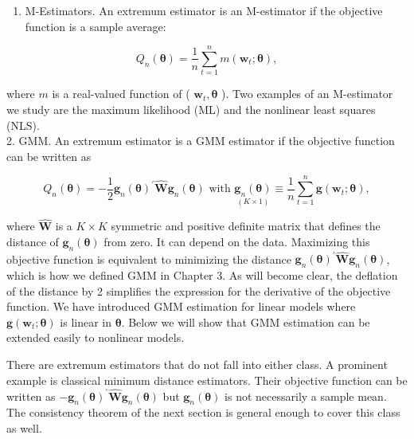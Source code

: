 \documentclass[10pt]{article}
\begin{document}
\begin{enumerate}
  \item M-Estimators. An extremum estimator is an M-estimator if the objective function is a sample average:
\end{enumerate}


\begin{equation*}
Q_{n}(\boldsymbol{\theta})=\frac{1}{n} \sum_{t=1}^{n} m\left(\mathbf{w}_{t} ; \boldsymbol{\theta}\right), \tag{7.1.2}
\end{equation*}


where $m$ is a real-valued function of ( $\mathbf{w}_{t}, \boldsymbol{\theta}$ ). Two examples of an M-estimator we study are the maximum likelihood (ML) and the nonlinear least squares (NLS).\\
2. GMM. An extremum estimator is a GMM estimator if the objective function can be written as


\begin{equation*}
Q_{n}(\boldsymbol{\theta})=-\frac{1}{2} \mathbf{g}_{n}(\boldsymbol{\theta})^{\prime} \widehat{\mathbf{W}} \mathbf{g}_{n}(\boldsymbol{\theta}) \text { with } \underset{(K \times 1)}{\mathbf{g}_{n}(\boldsymbol{\theta})} \equiv \frac{1}{n} \sum_{t=1}^{n} \mathbf{g}\left(\mathbf{w}_{t} ; \boldsymbol{\theta}\right), \tag{7.1.3}
\end{equation*}


where $\widehat{\mathbf{W}}$ is a $K \times K$ symmetric and positive definite matrix that defines the distance of $\mathbf{g}_{n}(\boldsymbol{\theta})$ from zero. It can depend on the data. Maximizing this objective function is equivalent to minimizing the distance $\mathbf{g}_{n}(\boldsymbol{\theta})^{\prime} \widehat{\mathbf{W}} \mathbf{g}_{n}(\boldsymbol{\theta})$, which is how we defined GMM in Chapter 3. As will become clear, the deflation of the distance by 2 simplifies the expression for the derivative of the objective function. We have introduced GMM estimation for linear models where $\mathbf{g}\left(\mathbf{w}_{t} ; \boldsymbol{\theta}\right)$ is linear in $\boldsymbol{\theta}$. Below we will show that GMM estimation can be extended easily to nonlinear models.

There are extremum estimators that do not fall into either class. A prominent example is classical minimum distance estimators. Their objective function can be\\
written as $-\mathbf{g}_{n}(\boldsymbol{\theta})^{\prime} \widehat{\mathbf{W}} \mathbf{g}_{n}(\boldsymbol{\theta})$ but $\mathbf{g}_{n}(\boldsymbol{\theta})$ is not necessarily a sample mean. The consistency theorem of the next section is general enough to cover this class as well.
\end{document}
